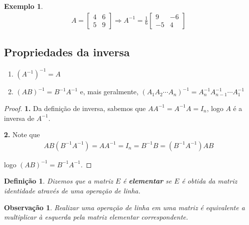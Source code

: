 \documentclass{article}
\newtheorem*{remark}{Observação}
\newtheorem*{definition}{Definição}
\newtheorem*{example}{Exemplo}
\begin{document}
\begin{example}
	\begin{align*}
	A = \begin{bmatrix}
	4 & 6 \\
	5 & 9
	\end{bmatrix} \Rightarrow A^{-1} = \frac{1}{6}\begin{bmatrix}
	9 & -6 \\
	-5 & 4
	\end{bmatrix}
	\end{align*}
\end{example}

\subsection{Propriedades da inversa}
\begin{enumerate}
	\item $(A^{-1})^{-1} = A$
	\item $(AB)^{-1} = B^{-1}A^{-1}$ e, mais geralmente, $(A_1A_2\cdots A_n)^{-1} = A_n^{-1}A_{n-1}^{-1}\cdots A_1^{-1}$
\end{enumerate}

\begin{proof}
	\textbf{1.} Da definição de inversa, sabemos que $AA^{-1} = A^{-1}A = I_n$, logo $A$ é a inversa de $A^{-1}$.
	\par\vspace{0.4cm}
	\hspace{17pt}\textbf{2.} Note que 
	\begin{align*}
	AB(B^{-1}A^{-1}) = AA^{-1} = I_n = B^{-1}B = (B^{-1}A^{-1})AB
	\end{align*}
	\par\vspace{0.3cm} logo $(AB)^{-1} = B^{-1}A^{-1}$.
\end{proof}


\begin{definition}
	Dizemos que a matriz $E$ é \textbf{elementar} se $E$ é obtida da matriz identidade através de uma operação de linha.
\end{definition}

\begin{remark}
	Realizar uma operação de linha em uma matriz é equivalente a multiplicar à esquerda pela matriz elementar correspondente.
\end{remark}
\end{document}
